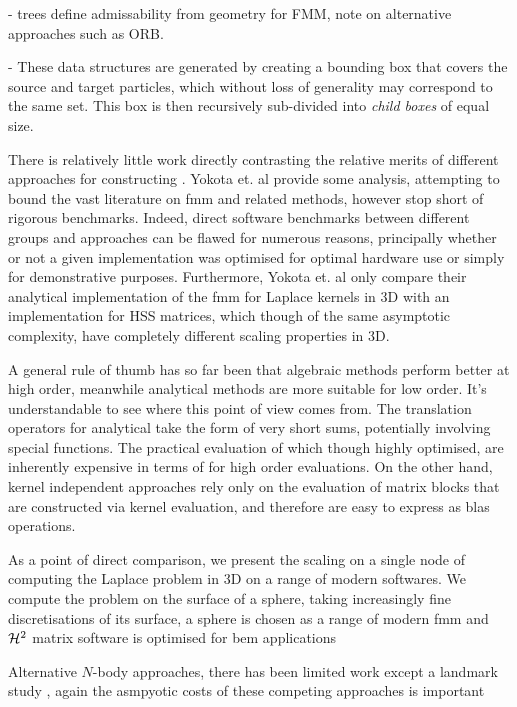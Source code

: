 - trees define admissability from geometry for FMM, note on alternative approaches such as ORB.

- These data structures are generated by creating a bounding box that covers the source and target particles, which without loss of generality may correspond to the same set. This box is then recursively sub-divided into \textit{child boxes} of equal size.

There is relatively little work directly contrasting the relative merits of different approaches for constructing . Yokota et. al \cite{yokota2015fast} provide some analysis, attempting to bound the vast literature on \acrshort{fmm} and related methods, however stop short of rigorous benchmarks. Indeed, direct software benchmarks between different groups and approaches can be flawed for numerous reasons, principally whether or not a given implementation was optimised for optimal hardware use or simply for demonstrative purposes. Furthermore, Yokota et. al only compare their analytical implementation of the \acrshort{fmm} for Laplace kernels in 3D with an implementation for HSS matrices, which though of the same asymptotic complexity, have completely different scaling properties in 3D.

A general rule of thumb has so far been that algebraic methods perform better at high order, meanwhile analytical methods are more suitable for low order. It's understandable to see where this point of view comes from. The translation operators for analytical  take the form of very short sums, potentially involving special functions. The practical evaluation of which though highly optimised, are inherently expensive in terms of  for high order evaluations. On the other hand, kernel independent approaches rely only on the evaluation of matrix blocks that are constructed via kernel evaluation, and therefore are easy to express as \acrshort{blas} operations.

As a point of direct comparison, we present the scaling on a single node of computing the Laplace problem in 3D on a range of modern softwares. We compute the problem on the surface of a sphere, taking increasingly fine discretisations of its surface, a sphere is chosen as a range of modern \acrshort{fmm} and $\mathcal{H}^2$ matrix software is optimised for \acrfull{bem} applications

Alternative $N$-body approaches, there has been limited work except a landmark study \cite{gholami2016fft}, again the asmpyotic costs of these competing approaches is important

